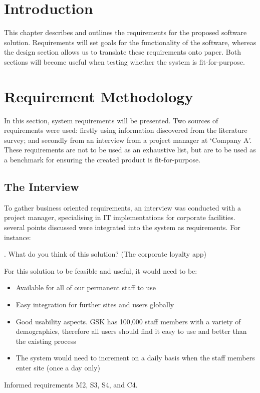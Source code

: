 \section{Introduction}
This chapter describes and outlines the requirements for the proposed software solution. Requirements will set goals for the functionality of the software, whereas the design section allows us to translate these requirements onto paper. Both sections will become useful when testing whether the system is fit-for-purpose.

\section{Requirement Methodology}
In this section, system requirements will be presented. Two sources of requirements were used: firstly using information discovered from the literature survey; and secondly from an interview from a project manager at `Company A'. These requirements are not to be used as an exhaustive list, but are to be used as a benchmark for ensuring the created product is fit-for-purpose.

\subsection{The Interview}
To gather business oriented requirements, an interview was conducted with a project manager, specialising in IT implementations for corporate facilities. several points discussed were integrated into the system as requirements. For instance:

{. What do you think of this solution? (The corporate loyalty app)

For this solution to be feasible and useful, it would need to be:

\begin{itemize}
\item Available for all of our permanent staff to use
\item Easy integration for further sites and users globally
\item Good usability aspects. GSK has 100,000 staff members with a variety of demographics, therefore all users should find it easy to use and better than the existing process
\item The system would need to increment on a daily basis when the staff members enter site (once a day only)
\end{itemize}
}

Informed requirements M2, S3, S4, and C4.

